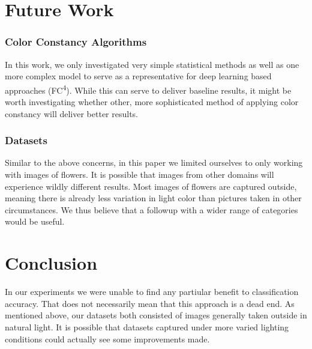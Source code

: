 \section{Future Work}

\subsubsection{Color Constancy Algorithms}

In this work, we only investigated very simple statistical methods as well as one more complex model to serve as a representative
for deep learning based approaches (FC\textsuperscript{4}). While this can serve to deliver baseline results, it might be worth investigating
whether other, more sophisticated method of applying color constancy will deliver better results.

\subsubsection{Datasets}

Similar to the above concerns, in this paper we limited ourselves to only working with images of flowers. It is possible that images from 
other domains will experience wildly different results. Most images of flowers are captured outside, meaning there is already less variation in
light color than pictures taken in other circumstances. We thus believe that a followup with a wider range of categories would be useful.


\section{Conclusion}

In our experiments we were unable to find any partiular benefit to classification accuracy. That does not necessarily mean that this approach is a dead
end. As mentioned above, our datasets both consisted of images generally taken outside in natural light. It is possible that datasets captured under
more varied lighting conditions could actually see some improvements made.